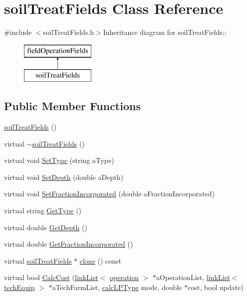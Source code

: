 \hypertarget{classsoil_treat_fields}{
\section{soilTreatFields Class Reference}
\label{classsoil_treat_fields}
}


{\ttfamily \#include $<$soilTreatFields.h$>$}Inheritance diagram for soilTreatFields::\begin{figure}[H]
\begin{center}
\leavevmode
\includegraphics[height=2cm]{classsoil_treat_fields}
\end{center}
\end{figure}
\subsection*{Public Member Functions}
\begin{DoxyCompactItemize}
\item 
\hyperlink{classsoil_treat_fields_a8ad117f99639581ba5f2591861193b77}{soilTreatFields} ()
\item 
virtual \hyperlink{classsoil_treat_fields_ac73a1dabe76596e3c21281c58cded486}{$\sim$soilTreatFields} ()
\item 
virtual void \hyperlink{classsoil_treat_fields_a9639937ca350ed628e772c862d1d59bd}{SetType} (string aType)
\item 
virtual void \hyperlink{classsoil_treat_fields_ad838ce1a0d1cd7bac15f53785026753e}{SetDepth} (double aDepth)
\item 
virtual void \hyperlink{classsoil_treat_fields_ac6d918f9c12375c55641c4cacf737b85}{SetFractionIncorporated} (double aFractionIncorporated)
\item 
virtual string \hyperlink{classsoil_treat_fields_a575166b12e7900f9b321b2ac1ad8e1ea}{GetType} ()
\item 
virtual double \hyperlink{classsoil_treat_fields_a4911e157230f7e676f8477ca4cedf2d6}{GetDepth} ()
\item 
virtual double \hyperlink{classsoil_treat_fields_adb3f2983e379667290a90d19463112a4}{GetFractionIncorporated} ()
\item 
virtual \hyperlink{classsoil_treat_fields}{soilTreatFields} $\ast$ \hyperlink{classsoil_treat_fields_ac7a0bac794823169aaa85319842ce4d9}{clone} () const 
\item 
virtual bool \hyperlink{classsoil_treat_fields_a1b486e3dcf8ea9e3c0e8c58ec801a3e9}{CalcCost} (\hyperlink{classlink_list}{linkList}$<$ \hyperlink{classoperation}{operation} $>$ $\ast$aOperationList, \hyperlink{classlink_list}{linkList}$<$ \hyperlink{classtech_equip}{techEquip} $>$ $\ast$aTechFarmList, \hyperlink{typer_8h_af05cf854fc14086a0d6404be5ae9813f}{calcLPType} mode, double $\ast$cost, bool update)
\end{DoxyCompactItemize}


